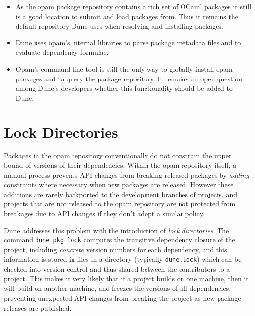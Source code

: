 \documentclass{article}
\begin{document}
\begin{multicols}{2}
        \begin{itemize}

        \item As the opam package repository contains a rich set of OCaml
              packages it still is a good location to submit and load packages
              from. Thus it remains the default repository Dune uses when
              resolving and installing packages.

        \item Dune uses opam's internal libraries to parse package metadata
              files and to evaluate dependency formulae.

        \item Opam's command-line tool is still the only way to globally install opam
              packages and to query the package repository. It remains an open
              question among Dune's developers whether this functionality should
              be added to Dune.

        \end{itemize}

        \section {Lock Directories}

        Packages in the opam repository conventionally do not constrain the
        upper bound of versions of their dependencies. Within the opam
        repository itself, a manual process prevents API changes from breaking
        released packages by \textit{adding} constraints where necessary when
        new packages are released. However these additions are rarely
        backported to the development branches of projects, and projects that
        are not released to the opam repository are not protected from
        breakages due to API changes if they don't adopt a similar policy.

        Dune addresses this problem with the introduction of \textit{lock
        directories}. The command \texttt{dune pkg lock} computes the transitive
        dependency closure of the project, including \textit{concrete} version
        numbers for each dependency, and this information is stored in files in
        a directory (typically \texttt{dune.lock}) which can be checked into
        version control and thus shared between the contributors to a project.
        This makes it very likely that if a project builds on one machine, then
        it will build on another machine, and freezes the versions of all
        dependencies, preventing unexpected API changes from breaking the
        project as new package releases are published.


\end{multicols}
\end{document}
